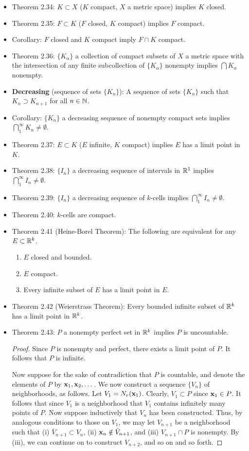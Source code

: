 \documentclass[../../notes.tex]{subfiles}
\begin{document}
\begin{itemize}
    \item Theorem 2.34: $K\subset X$ ($K$ compact, $X$ a metric space) implies $K$ closed.
    \item Theorem 2.35: $F\subset K$ ($F$ closed, $K$ compact) implies $F$ compact.
    \item Corollary: $F$ closed and $K$ compact imply $F\cap K$ compact.
    \item Theorem 2.36: $\{K_\alpha\}$ a collection of compact subsets of $X$ a metric space with the intersection of any finite subcollection of $\{K_\alpha\}$ nonempty implies $\bigcap K_\alpha$ nonempty.
    \item \textbf{Decreasing} (sequence of sets $\{K_n\}$): A sequence of sets $\{K_n\}$ such that $K_n\supset K_{n+1}$ for all $n\in\mathbb{N}$.
    \item Corollary: $\{K_n\}$ a decreasing sequence of nonempty compact sets implies $\bigcap_1^\infty K_n\neq\emptyset$.
    \item Theorem 2.37: $E\subset K$ ($E$ infinite, $K$ compact) implies $E$ has a limit point in $K$.
    \item Theorem 2.38: $\{I_n\}$ a decreasing sequence of intervals in $\mathbb{R}^1$ implies $\bigcap_1^\infty I_n\neq\emptyset$.
    \item Theorem 2.39: $\{I_n\}$ a decreasing sequence of $k$-cells implies $\bigcap_1^\infty I_n\neq\emptyset$.
    \item Theorem 2.40: $k$-cells are compact.
    \item Theorem 2.41 (Heine-Borel Theorem): The following are equivalent for any $E\subset\mathbb{R}^k$.
    \begin{enumerate}[label={(\alph*)}]
        \item $E$ closed and bounded.
        \item $E$ compact.
        \item Every infinite subset of $E$ has a limit point in $E$.
    \end{enumerate}
    \item Theorem 2.42 (Weierstrass Theorem): Every bounded infinite subset of $\mathbb{R}^k$ has a limit point in $\mathbb{R}^k$.
    \item Theorem 2.43: $P$ a nonempty perfect set in $\mathbb{R}^k$ implies $P$ is uncountable.
    \begin{proof}
        Since $P$ is nonempty and perfect, there exists a limit point of $P$. It follows that $P$ is infinite.\par
        Now suppose for the sake of contradiction that $P$ is countable, and denote the elements of $P$ by $\mathbf{x}_1,\mathbf{x}_2,\dots$. We now construct a sequence $\{V_n\}$ of neighborhoods, as follows. Let $V_1=N_r(\mathbf{x}_1)$. Clearly, $V_1\subset P$ since $\mathbf{x}_1\in P$. It follows that since $V_1$ is a neighborhood that $V_1$ contains infinitely many points of $P$. Now suppose inductively that $V_n$ has been constructed. Thus, by analogous conditions to those on $V_1$, we may let $V_{n+1}$ be a neighborhood such that (i) $\bar{V}_{n+1}\subset V_n$, (ii) $\mathbf{x}_n\notin\bar{V}_{n+1}$, and (iii) $V_{n+1}\cap P$ is nonempty. By (iii), we can continue on to construct $V_{n+2}$, and so on and so forth.\par

\end{proof}
\end{itemize}
\end{document}
